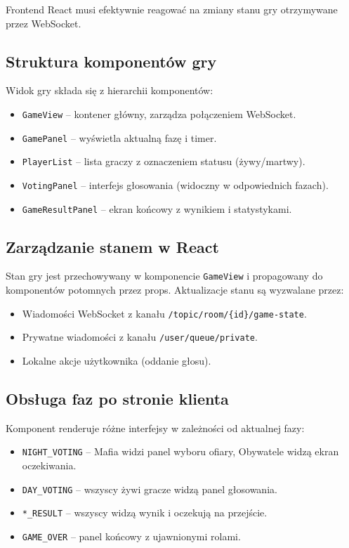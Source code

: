 ﻿\documentclass[a4paper,twoside,11pt]{mwrep}
\theoremstyle{plain} \newtheorem{thm}{Twierdzenie}
\theoremstyle{plain} \newtheorem{lem}{Lemat}
\theoremstyle{definition} \newtheorem{defn}{Definicja}
\theoremstyle{remark} \newtheorem*{rem}{Wniosek}
\begin{document}
Frontend React musi efektywnie reagować na zmiany stanu gry otrzymywane przez WebSocket.

\subsection{Struktura komponentów gry}

Widok gry składa się z hierarchii komponentów:
\begin{itemize}
    \item \texttt{GameView} -- kontener główny, zarządza połączeniem WebSocket.
    \item \texttt{GamePanel} -- wyświetla aktualną fazę i timer.
    \item \texttt{PlayerList} -- lista graczy z oznaczeniem statusu (żywy/martwy).
    \item \texttt{VotingPanel} -- interfejs głosowania (widoczny w odpowiednich fazach).
    \item \texttt{GameResultPanel} -- ekran końcowy z wynikiem i statystykami.
\end{itemize}

\subsection{Zarządzanie stanem w React}

Stan gry jest przechowywany w komponencie \texttt{GameView} i propagowany do komponentów potomnych przez props. Aktualizacje stanu są wyzwalane przez:
\begin{itemize}
    \item Wiadomości WebSocket z kanału \texttt{/topic/room/\{id\}/game-state}.
    \item Prywatne wiadomości z kanału \texttt{/user/queue/private}.
    \item Lokalne akcje użytkownika (oddanie głosu).
\end{itemize}

\subsection{Obsługa faz po stronie klienta}

Komponent renderuje różne interfejsy w zależności od aktualnej fazy:
\begin{itemize}
    \item \texttt{NIGHT\_VOTING} -- Mafia widzi panel wyboru ofiary, Obywatele widzą ekran oczekiwania.
    \item \texttt{DAY\_VOTING} -- wszyscy żywi gracze widzą panel głosowania.
    \item \texttt{*\_RESULT} -- wszyscy widzą wynik i oczekują na przejście.
    \item \texttt{GAME\_OVER} -- panel końcowy z ujawnionymi rolami.
\end{itemize}
\end{document}
